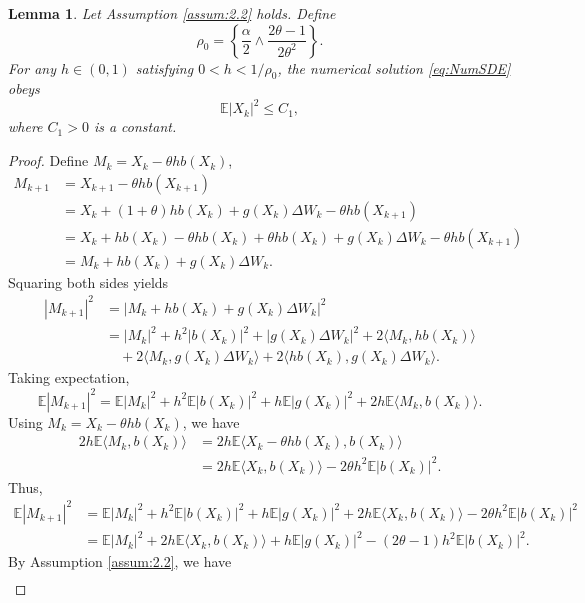 \documentclass{article}
\newtheorem{lemma}[theorem]{Lemma}
\begin{document}
\begin{lemma}\label{lem:3.1}
Let Assumption \ref{assum:2.2} holds. Define 
\[
\rho_0 = \left\{ \dfrac{\alpha}{2}\wedge \dfrac{2\theta - 1}{2\theta^2} \right\}.
\]
For any $h\in(0,1)$ satisfying $0 < h < 1/\rho_0$, the numerical solution \eqref{eq:NumSDE} obeys
\[
\mathbb{E}|X_k|^2 \le C_1,
\]
where $C_1 > 0$ is a constant.
\end{lemma}
\begin{proof}
Define $ M_k = X_k - \theta h b(X_k) $,  
\[
\begin{aligned}
	M_{k+1} &= X_{k+1} - \theta h b(X_{k+1}) \\
	&= X_k + (1+\theta)h b(X_k) + g(X_k)\Delta W_k - \theta h b(X_{k+1}) \\
	&= X_k + h b(X_k) - \theta h b(X_k) + \theta h b(X_k) + g(X_k)\Delta W_k - \theta h b(X_{k+1}) \\
	&= M_k + h b(X_k) + g(X_k)\Delta W_k.
\end{aligned}
\]  
Squaring both sides yields  
\[
\begin{aligned}
	|M_{k+1}|^2 &= |M_k + h b(X_k) + g(X_k)\Delta W_k|^2 \\
	&= |M_k|^2 + h^2 |b(X_k)|^2 + |g(X_k)\Delta W_k|^2 + 2\langle M_k, h b(X_k) \rangle \\ &\quad + 2\langle M_k, g(X_k)\Delta W_k \rangle + 2\langle h b(X_k), g(X_k)\Delta W_k \rangle.
\end{aligned}
\]  
Taking expectation,  
\[
\mathbb{E}|M_{k+1}|^2 = \mathbb{E}|M_k|^2 + h^2 \mathbb{E}|b(X_k)|^2 + h \mathbb{E}|g(X_k)|^2 + 2h \mathbb{E}\langle M_k, b(X_k) \rangle.
\]  
Using $ M_k = X_k - \theta h b(X_k) $, we have  
\[
\begin{aligned}
	2h \mathbb{E}\langle M_k, b(X_k) \rangle &= 2h \mathbb{E}\langle X_k - \theta h b(X_k), b(X_k) \rangle \\
	&= 2h \mathbb{E}\langle X_k, b(X_k) \rangle - 2\theta h^2 \mathbb{E}|b(X_k)|^2.
\end{aligned}
\]  
Thus,  
\[
\begin{aligned}
	\mathbb{E}|M_{k+1}|^2 &= \mathbb{E}|M_k|^2 + h^2 \mathbb{E}|b(X_k)|^2 + h \mathbb{E}|g(X_k)|^2 + 2h \mathbb{E}\langle X_k, b(X_k) \rangle - 2\theta h^2 \mathbb{E}|b(X_k)|^2 \\
	&= \mathbb{E}|M_k|^2 + 2h \mathbb{E}\langle X_k, b(X_k) \rangle + h \mathbb{E}|g(X_k)|^2 - (2\theta - 1)h^2 \mathbb{E}|b(X_k)|^2.
\end{aligned}
\]  
By Assumption \ref{assum:2.2}, we have  
\[
\begin{aligned}

\end{aligned}\]
\end{proof}
\end{document}
